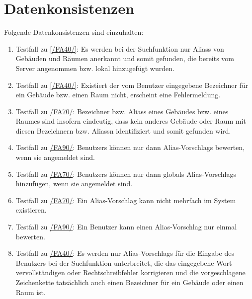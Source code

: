 \section{Datenkonsistenzen}

Folgende Datenkonsistenzen sind einzuhalten:
\begin{enumerate}[label=\textbf{/T\arabic*0/}, align=left, resume]
	\item \label{/T300/} Testfall zu \ref{/FA40/}: Es werden bei der Suchfunktion nur \Glspl{Alias} von Gebäuden und Räumen anerkannt und somit gefunden, die bereits vom \Gls{Server} angenommen bzw. \gls{lokal} hinzugefügt wurden.
	\item \label{/T310/} Testfall zu \ref{/FA40/}: Existiert der vom \Gls{Benutzer} eingegebene Bezeichner für ein Gebäude bzw. einen Raum nicht, erscheint eine Fehlermeldung.
	\item \label{/T320/} Testfall zu \hyperref[/FA70/]{/FA70/}: Bezeichner bzw. \Glspl{Alias} eines Gebäudes bzw. eines Raumes sind insofern eindeutig, dass kein anderes Gebäude oder Raum mit diesen Bezeichnern bzw. \Glspl{Alias}n identifiziert und somit gefunden wird.
	\item \label{/T330/} Testfall zu \hyperref[/FA90/]{/FA90/}: \Glspl{Benutzer} können nur dann \Glspl{Alias-Vorschlag} bewerten, wenn sie angemeldet sind.
	\item \label{/T340/} Testfall zu \hyperref[/FA70/]{/FA70/}: \Glspl{Benutzer} können nur dann \glspl{global} \Glspl{Alias-Vorschlag} hinzufügen, wenn sie angemeldet sind.
	\item \label{/T350/} Testfall zu \hyperref[/FA70/]{/FA70/}: Ein \Gls{Alias-Vorschlag} kann nicht mehrfach im System existieren.
	\item \label{/T360/} Testfall zu \hyperref[/FA90/]{/FA90/}: Ein \Gls{Benutzer} kann einen \Gls{Alias-Vorschlag} nur einmal bewerten.
	\item \label{/T370/} Testfall zu \hyperref[/FA40/]{/FA40/}: Es werden nur \Glspl{Alias-Vorschlag} für die Eingabe des \Gls{Benutzer}s bei der Suchfunktion unterbreitet, die das eingegebene Wort vervollständigen oder Rechtschreibfehler korrigieren und die vorgeschlagene Zeichenkette tatsächlich auch einen Bezeichner für ein Gebäude oder einen Raum ist.
\end{enumerate}